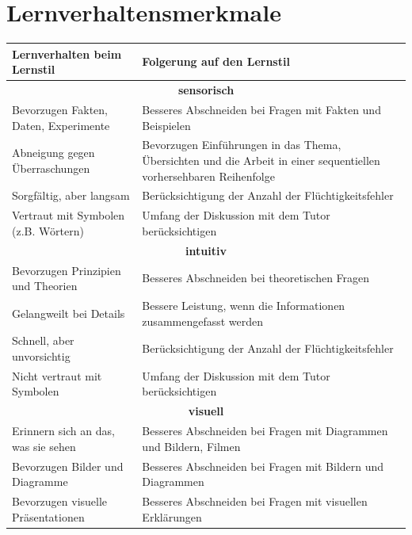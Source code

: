 \section{Lernverhaltensmerkmale}

\begingroup \label{Prototyp_Anhang}
  \footnotesize 
\begin{longtable}{|m{7.5cm}|m{7.5cm}|}
  \hline     
  \rowcolor[HTML]{EFEFEF}                                         
  \centering \textbf{Lernverhalten beim Lernstil} & \centering \arraybackslash \textbf{Folgerung auf den Lernstil} \\ 
  \hline  \hline 
   

  \multicolumn{2}{|c|}{\textbf{sensorisch}} \\ \hline \hline 
  Bevorzugen Fakten, Daten, Experimente & Besseres Abschneiden bei Fragen mit Fakten und Beispielen  \\ \hline
  Abneigung gegen Überraschungen & Bevorzugen Einführungen in das Thema, Übersichten und die Arbeit in einer sequentiellen vorhersehbaren Reihenfolge \\ \hline
  Sorgfältig, aber langsam & Berücksichtigung der Anzahl der Flüchtigkeitsfehler \\ \hline
  Vertraut mit Symbolen (z.B. Wörtern) & Umfang der Diskussion mit dem Tutor berücksichtigen\\ \hline  \hline   
   

  \multicolumn{2}{|c|}{\textbf{intuitiv}} \\ \hline \hline 
  Bevorzugen Prinzipien und Theorien & Besseres Abschneiden bei theoretischen Fragen \\ \hline
  Gelangweilt bei Details & Bessere Leistung, wenn die Informationen zusammengefasst werden \\ \hline
  Schnell, aber unvorsichtig & Berücksichtigung der Anzahl der Flüchtigkeitsfehler \\ \hline
  Nicht vertraut mit Symbolen & Umfang der Diskussion mit dem Tutor berücksichtigen \\ \hline  \hline 
   
  
  \multicolumn{2}{|c|}{\textbf{visuell}} \\ \hline \hline 
  Erinnern sich an das, was sie sehen & Besseres Abschneiden bei Fragen mit Diagrammen und Bildern, Filmen \\ \hline
  Bevorzugen Bilder und Diagramme & Besseres Abschneiden bei Fragen mit Bildern und Diagrammen \\ \hline
  Bevorzugen visuelle Präsentationen & Besseres Abschneiden bei Fragen mit visuellen Erklärungen \\ \hline  \hline   
   


\end{longtable}
